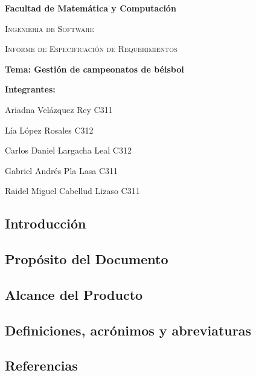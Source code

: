 \documentclass{report}
\begin{document}
    \begin{titlepage}
        \centering
        {\bfseries\LARGE Facultad de Matemática y Computación \par}
        \vspace*{1cm}
        {\scshape\Large Ingeniería de Software \par}
        \vspace*{3cm}
        {\scshape\Huge Informe de Especificación de Requerimientos \par}
        \vspace*{1cm}
        {\LARGE \textbf{Tema: Gestión de campeonatos de béisbol} }
        \vfill
        {\bfseries\LARGE Integrantes: \par}
        {\Large Ariadna Vel\'azquez Rey  C311 \par} 
        {\Large L\'ia L\'opez Rosales  C312 \par} 
        {\Large Carlos Daniel Largacha Leal  C312 \par} 
        {\Large Gabriel Andr\'es Pla Lasa  C311 \par} 
        {\Large Raidel Miguel Cabellud Lizaso C311 \par} 
        \vfill
    \end{titlepage}

    \begin{center}
        \section*{Introducción}
    \end{center}

        \subsection*{Propósito del Documento}

        \subsection*{Alcance del Producto}

        \subsection*{Definiciones, acrónimos y abreviaturas}

        \subsection*{Referencias}
\end{document}

